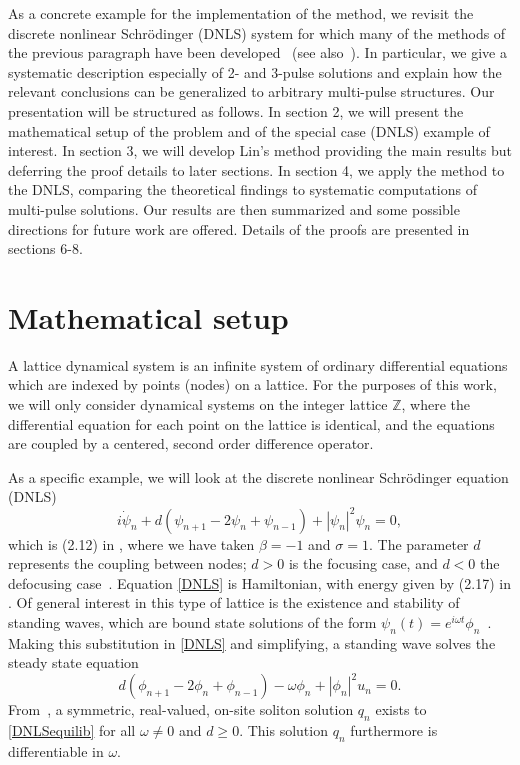 \documentclass[12pt]{elsarticle}
\def\Z{{\mathbb Z}}
\begin{document}
As a concrete example for the implementation of the method, we revisit the
discrete nonlinear Schr{\"o}dinger (DNLS) system for which many of the methods of the previous paragraph have been developed~\cite{Kevrekidis2009} (see also~\cite{pelinovsky_2011}). In particular, we give a 
systematic description especially of 2- and 3-pulse solutions and explain how the relevant conclusions can be generalized
to arbitrary multi-pulse structures. 
Our presentation will be structured as follows.
In section 2, we will present the mathematical
setup of the problem and of the special case (DNLS)
example of interest. In section 3, we will develop
Lin's method providing the main results but deferring
the proof details to later sections. In section 4,
we apply the method to the DNLS, comparing the theoretical findings to systematic computations of multi-pulse solutions. Our results are then summarized and some possible directions for future work are offered. Details of the proofs are presented in sections 6-8.

\section{Mathematical setup}

A lattice dynamical system is an infinite system of ordinary differential equations which are indexed by points (nodes)
on a lattice. For the purposes of this work, we will only consider dynamical systems on the integer lattice $\Z$, where the differential equation for each point on the lattice is identical, and the equations are coupled by a centered, second order difference operator.

As a specific example, we will look at the discrete nonlinear Schr{\"o}dinger equation (DNLS)
\begin{equation}\label{DNLS}
i\dot{\psi}_n + d(\psi_{n+1} - 2 \psi_n + \psi_{n-1}) + |\psi_n|^2 \psi_n = 0,
\end{equation}
which is (2.12) in \cite{Kevrekidis2009}, where we have taken $\beta = -1$ and $\sigma = 1$. The parameter $d$ represents the coupling between nodes; $d > 0$ is the focusing case, and $d < 0$ the defocusing case~\cite{Kevrekidis2009}. Equation \cref{DNLS} is Hamiltonian, with energy given by (2.17) in \cite{Kevrekidis2009,pelinovsky_2011}. Of general interest in this type of lattice is the existence and stability of standing waves, which are bound state solutions of the form $\psi_n(t) = e^{i \omega t}\phi_n$~\cite{alfimov}. Making this substitution in \cref{DNLS} and simplifying, a standing wave solves the steady state equation
\begin{equation}\label{DNLSequilib}
d(\phi_{n+1} - 2 \phi_n + \phi_{n-1}) - \omega \phi_n + |\phi_n|^2 u_n = 0.
\end{equation}
From~\cite{herrmann_2011}, a symmetric, real-valued, on-site soliton solution $q_n$ exists to \cref{DNLSequilib} for all $\omega \neq 0$ and $d \geq 0$. This solution $q_n$ furthermore is differentiable in $\omega$. 
\end{document}

